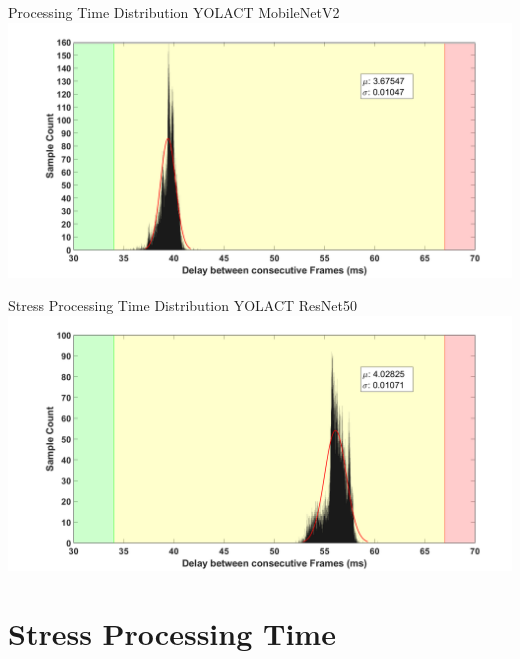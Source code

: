 \documentclass[18pt]{beamer}
\begin{document}
\begin{frame}{Processing Time Distribution YOLACT MobileNetV2}
\includegraphics[width=\textwidth]{figures/graphs/dist_yolact_mobilenetv2.png}
\end{frame}

\begin{frame}{Stress Processing Time Distribution YOLACT ResNet50}
\includegraphics[width=\textwidth]{figures/graphs/dist_yolact_resnet50.png}
\end{frame}

\section{Stress Processing Time}
\end{document}
